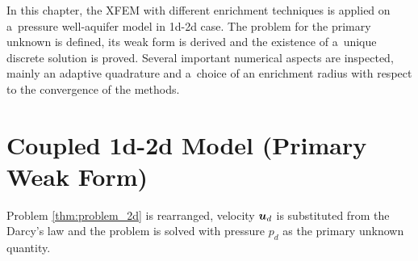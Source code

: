 In this chapter, the XFEM with different enrichment techniques is applied on a~pressure well-aquifer model
in 1d-2d case. The problem for the primary unknown is defined, its weak form is derived and
the existence of a~unique discrete solution is proved.
Several important numerical aspects are inspected, mainly an adaptive quadrature and
a~choice of an enrichment radius with respect to the convergence of the methods.

\section{Coupled 1d-2d Model (Primary Weak Form)}
\label{sec:primary_form}

Problem \ref{thm:problem_2d} is rearranged, velocity $\mathbf{\boldsymbol{u}}_d$ is substituted from the Darcy's law and the problem is solved
with pressure $p_d$ as the primary unknown quantity.

